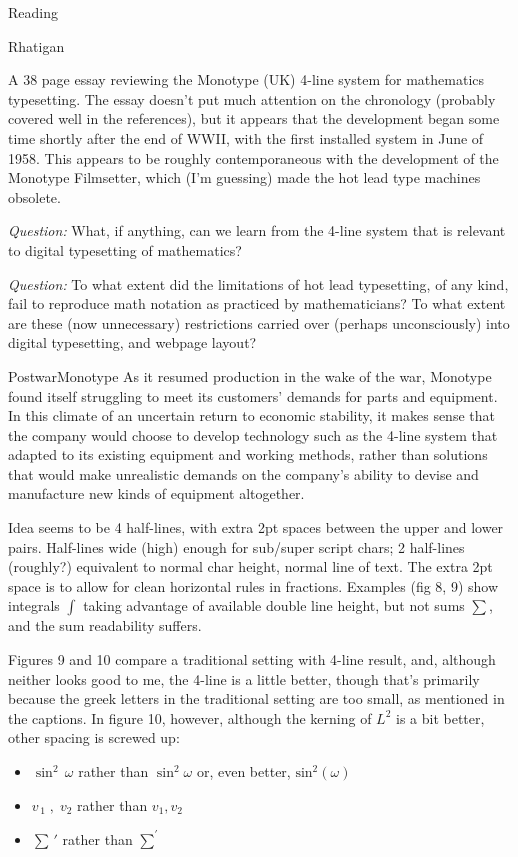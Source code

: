 \documentclass[11pt]{PalisadesLakesBook}
\begin{document}
\begin{plSection}{Reading}
\begin{plSection}{Rhatigan}
\begin{plSection}{}
A 38 page essay reviewing the Monotype (UK)
4-line system for mathematics typesetting.
The essay doesn't put much attention on the chronology
(probably covered well in the references),
but it appears that the development
began some time shortly after the end of WWII,
with the first installed system in June of 1958.
This appears to be roughly contemporaneous with
the development of the Monotype Filmsetter,
which (I'm guessing) made the hot lead type machines 
obsolete.~\cite{Eye:2012:MonotypeTimeline}

\emph{Question:} What, if anything, can we learn from the
4-line system that is relevant to digital typesetting
of mathematics?

\emph{Question:} To what extent did the limitations of
hot lead typesetting, of any kind, 
fail to reproduce math notation as practiced by mathematicians?
To what extent are these (now unnecessary) restrictions
carried over (perhaps unconsciously) into digital typesetting,
and webpage layout?

\begin{plQuote}
{}
{PostwarMonotype}
As it resumed production in the wake of the war,
Monotype found itself struggling to meet its customers'
demands for parts and equipment. 
In this climate of an uncertain return to economic stability,
it makes sense that the company would choose to develop
technology such as the 4-line system that adapted to its existing
equipment and working methods, 
rather than solutions that would make unrealistic demands
on the company's ability to devise and manufacture 
new kinds of equipment altogether. 
\end{plQuote}

Idea seems to be 4 half-lines, with extra 2pt spaces between the 
upper and lower pairs.
Half-lines wide (high) enough for sub/super script chars;
2 half-lines (roughly?) equivalent to normal char height, 
normal line of text.
The extra 2pt space is to allow for clean horizontal rules in
fractions.
Examples (fig 8, 9) show integrals $\int$ 
taking advantage of 
available double line height, but not sums $\sum$,
and the sum readability suffers.

Figures 9 and 10 compare a traditional setting with 4-line result,
and, although neither looks good to me,
the 4-line is a little better,
though that's primarily because the greek letters 
in the traditional setting are too small,
as mentioned in the captions.
In figure 10, however, although the kerning of 
$L^2$ is a bit better, other spacing is screwed up:
\begin{itemize}
\item $\sin^2 \,\omega$ rather than $\sin^{2}\!\omega$ or, even better, 
 $\textrm{sin}^{2}\!\left(\omega\right)$
\item $v_{\,1}\;,\;v_{2}$ rather than $v_{1},v_{2}$
\item $\sum\,'$ rather than $\sum^{'}$
\end{itemize}


\end{plSection}
\end{plSection}
\end{plSection}
\end{document}

